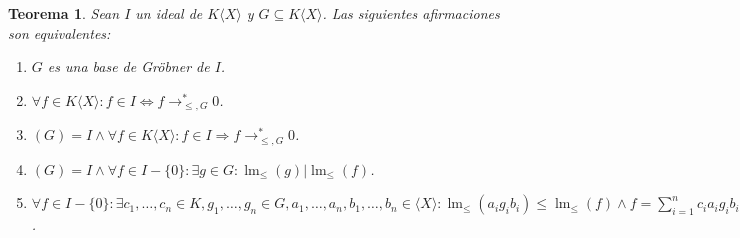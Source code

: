 \documentclass[12pt]{report}
\theoremstyle{customstyle}
\newtheorem{theorem}{Teorema}[chapter]
\theoremstyle{factstyle}
\DeclareMathOperator{\lm}{lm}
\begin{document}
\begin{theorem}\label{thm:equivalencias de base de Gröbner}
  Sean $I$ un ideal de $K⟨X⟩$ y $G ⊆ K⟨X⟩$. Las siguientes afirmaciones son equivalentes:
  \begin{enumerate}
    \item $G$ es una base de Gröbner de $I$. \label{thm:egb:1}

    \item $∀f ∈ K⟨X⟩ : f ∈ I ⇔ f →^*_{≤, G} 0$. \label{thm:egb:2}

    \item $(G) = I ∧ ∀f ∈ K⟨X⟩ : f ∈ I ⇒ f →^*_{≤, G} 0$. \label{thm:egb:3}

    \item $(G) = I ∧ ∀f ∈ I - \{0\} : ∃g ∈ G : \lm_≤(g) | \lm_≤(f)$. \label{thm:egb:4}

    \item $∀f ∈ I - \{0\} : ∃c_1, …, c_n ∈ K, g_1, …, g_n ∈ G, a_1, …, a_n, b_1, …, b_n ∈ ⟨X⟩ : \lm_≤(a_i g_i b_i) ≤ \lm_≤(f) ∧ f = ∑_{i = 1}^n c_i a_i g_i b_i$.  \label{thm:egb:5}
  \end{enumerate}
\end{theorem}
\end{document}
